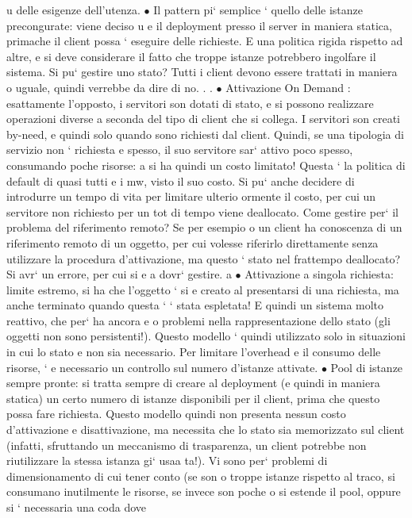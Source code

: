 \documentclass[a4paper,12pt]{article}
\begin{document}
u
delle esigenze dell'utenza.
$\bullet$ Il pattern pi` semplice ` quello delle istanze precongurate: viene deciso
u
e
il deployment presso il server in maniera statica, primache il client possa
`
eseguire delle richieste. E una politica rigida rispetto ad altre, e si deve
considerare il fatto che troppe istanze potrebbero ingolfare il sistema. Si
pu` gestire uno stato? Tutti i client devono essere trattati in maniera
o
uguale, quindi verrebbe da dire di no. . .
$\bullet$ Attivazione On Demand : esattamente l'opposto, i servitori son dotati di
stato, e si possono realizzare operazioni diverse a seconda del tipo di client
che si collega. I servitori son creati by-need, e quindi solo quando sono
richiesti dal client. Quindi, se una tipologia di servizio non ` richiesta
e
spesso, il suo servitore sar` attivo poco spesso, consumando poche risorse:
a
si ha quindi un costo limitato! Questa ` la politica di default di quasi tutti
e
i mw, visto il suo costo.
Si pu` anche decidere di introdurre un tempo di vita per limitare ulterio
ormente il costo, per cui un servitore non richiesto per un tot di tempo
viene deallocato.
Come gestire per` il problema del riferimento remoto? Se per esempio
o
un client ha conoscenza di un riferimento remoto di un oggetto, per cui
volesse riferirlo direttamente senza utilizzare la procedura d'attivazione,
ma questo ` stato nel frattempo deallocato? Si avr` un errore, per cui si
e
a
dovr` gestire.
a
$\bullet$ Attivazione a singola richiesta: limite estremo, si ha che l'oggetto ` si
e
creato al presentarsi di una richiesta, ma anche terminato quando questa
`
` stata espletata! E quindi un sistema molto reattivo, che per` ha ancora
e
o
problemi nella rappresentazione dello stato (gli oggetti non sono persistenti!). Questo modello ` quindi utilizzato solo
in situazioni in cui lo stato
e
non sia necessario. Per limitare l'overhead e il consumo delle risorse, `
e
necessario un controllo sul numero d'istanze attivate.
$\bullet$ Pool di istanze sempre pronte: si tratta sempre di creare al deployment
(e quindi in maniera statica) un certo numero di istanze disponibili per
il client, prima che questo possa fare richiesta. Questo modello quindi
non presenta nessun costo d'attivazione e disattivazione, ma necessita che
lo stato sia memorizzato sul client (infatti, sfruttando un meccanismo di
trasparenza, un client potrebbe non riutilizzare la stessa istanza gi` usaa
ta!). Vi sono per` problemi di dimensionamento di cui tener conto (se son
o
troppe istanze rispetto al traco, si consumano inutilmente le risorse, se
invece son poche o si estende il pool, oppure si ` necessaria una coda dove
\end{document}
